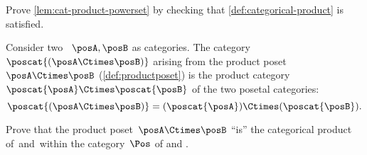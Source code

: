\vfill
\begin{gradedexercise}
    \label{ex:CatProductPowerset}
    Prove \cref{lem:cat-product-powerset} by checking that \cref{def:categorical-product} is satisfied.
\end{gradedexercise}


\begin{example}
    Consider two ~$\posA,\posB$ as categories.
    The category~$\poscat{(\posA\Ctimes \posB)}$ arising from the product poset~$\posA\Ctimes \posB$ (\cref{def:productposet}) is the product category~$\poscat{\posA} \Ctimes \poscat{\posB}$ of the two posetal categories:
    \begin{equation}
        \poscat{(\posA\Ctimes \posB)} = (\poscat{\posA}) \Ctimes (\poscat{\posB}).
    \end{equation}
\end{example}

\begin{gradedexercise}
    Prove that the product poset~$\posA \Ctimes \posB$ ``is'' the categorical product of~\posA and~\posB within the category~$\Pos$ of  and .
\end{gradedexercise}

